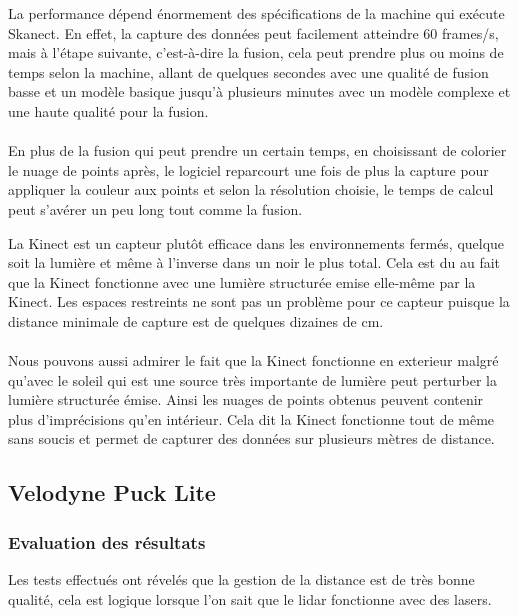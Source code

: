             \normalsize{
                La performance dépend énormement des spécifications de la machine qui exécute Skanect. En effet, la capture des données peut facilement atteindre 60 frames/s, mais à l'étape suivante, c'est-à-dire la fusion, cela peut prendre plus ou moins de temps selon la machine, allant de quelques secondes avec une qualité de fusion basse et un modèle basique jusqu'à plusieurs minutes avec un modèle complexe et une haute qualité pour la fusion.
            }
            \\ \\
            \normalsize{
                En plus de la fusion qui peut prendre un certain temps, en choisissant de colorier le nuage de points après, le logiciel reparcourt une fois de plus la capture pour appliquer la couleur aux points et selon la résolution choisie, le temps de calcul peut s'avérer un peu long tout comme la fusion.
            }

            
            \normalsize{
                La Kinect est un capteur plutôt efficace dans les environnements fermés, quelque soit la lumière et même à l'inverse dans un noir le plus total. Cela est du au fait que la Kinect fonctionne avec une lumière structurée emise elle-même par la Kinect. Les espaces restreints ne sont pas un problème pour ce capteur puisque la distance minimale de capture est de quelques dizaines de cm.
            }
            \\ \\
            \normalsize{
                Nous pouvons aussi admirer le fait que la Kinect fonctionne en exterieur malgré qu'avec le soleil qui est une source très importante de lumière peut perturber la lumière structurée émise. Ainsi les nuages de points obtenus peuvent contenir plus d'imprécisions qu'en intérieur. Cela dit la Kinect fonctionne tout de même sans soucis et permet de capturer des données sur plusieurs mètres de distance.
            }


\subsection{Velodyne Puck Lite}
    \subsubsection{Evaluation des résultats}
            \normalsize{
                Les tests effectués ont révelés que la gestion de la distance est de très bonne qualité, cela est logique lorsque l'on sait que le lidar fonctionne avec des lasers.
            }
        
